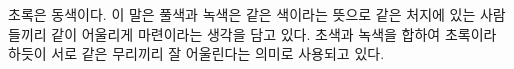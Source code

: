\documentclass[twoside,phd,4x6]{snuthesis}
\begin{document}



% 

% 





\clearpage
\begingroup
	\clearpage{}
	\printbibliography
\endgroup

%


\cleardoublepage
\begin{abstractalt}
\hspace{\parindent}
초록은 동색이다.
이 말은 풀색과 녹색은 같은 색이라는 뜻으로 같은 처지에 있는 사람들끼리 같이 어울리게 마련이라는 생각을 담고 있다.
초색과 녹색을 합하여 초록이라 하듯이 서로 같은 무리끼리 잘 어울린다는 의미로 사용되고 있다.
\end{abstractalt}

\end{document}
